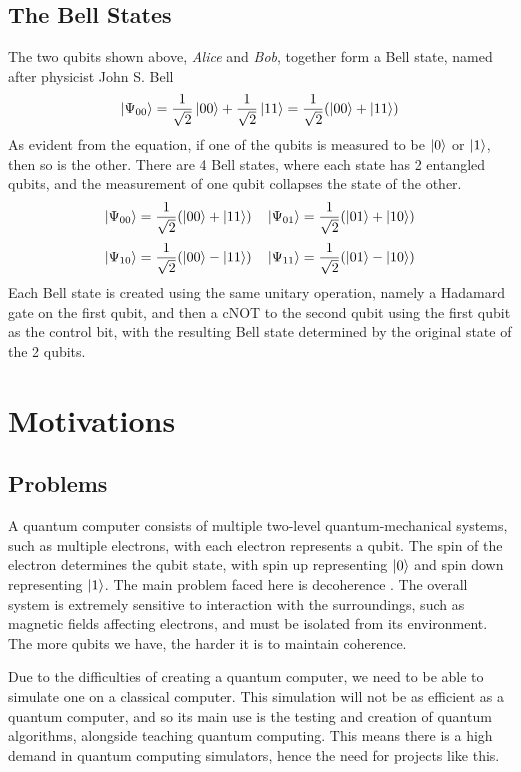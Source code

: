 \documentclass[a4paper,10pt, titlepage, twoside]{article}
\begin{document}
\subsection{The Bell States}
The two qubits shown above, \textit{Alice} and \textit{Bob}, together form a Bell state, named after physicist John S. Bell
$$\ket{\Psi_{00}} = \frac{1}{\sqrt{2}}\ket{00} + \frac{1}{\sqrt{2}}\ket{11} = \frac{1}{\sqrt{2}}(\ket{00} + \ket{11})$$
As evident from the equation, if one of the qubits is measured to be $\ket{0}$ or $\ket{1}$, then so is the other. There are 4 Bell states, where each state has 2 entangled qubits, and the measurement of one qubit collapses the state of the other.
$$\ket{\Psi_{00}} = \frac{1}{\sqrt{2}}(\ket{00} + \ket{11}) \quad \ket{\Psi_{01}} = \frac{1}{\sqrt{2}}(\ket{01} + \ket{10})$$
$$\ket{\Psi_{10}} = \frac{1}{\sqrt{2}}(\ket{00} - \ket{11}) \quad \ket{\Psi_{11}} = \frac{1}{\sqrt{2}}(\ket{01} - \ket{10})$$
Each Bell state is created using the same unitary operation, namely a Hadamard gate on the first qubit, and then a cNOT to the second qubit using the first qubit as the control bit, with the resulting Bell state determined by the original state of the 2 qubits.

\section{Motivations}
\subsection{Problems}
A quantum computer consists of multiple two-level quantum-mechanical systems, such as multiple electrons, with each electron represents a qubit. The spin of the electron determines the qubit state, with spin up representing $\ket{0}$ and spin down representing $\ket{1}$. The main problem faced here is decoherence \cite{decoherence2}. The overall system is extremely sensitive to interaction with the surroundings, such as magnetic fields affecting electrons, and must be isolated from its environment. The more qubits we have, the harder it is to maintain coherence.\par
Due to the difficulties of creating a quantum computer, we need to be able to simulate one on a classical computer. This simulation will not be as efficient as a quantum computer, and so its main use is the testing and creation of quantum algorithms, alongside teaching quantum computing. This means there is a high demand in quantum computing simulators, hence the need for projects like this.
\end{document}
